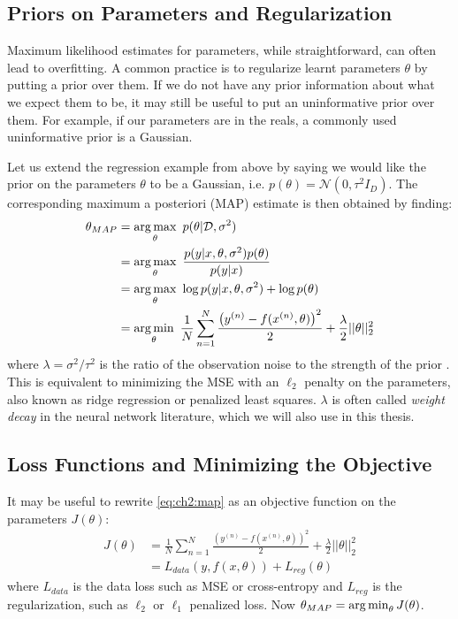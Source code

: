 \subsection{Priors on Parameters and Regularization}
  Maximum likelihood estimates for parameters, while straightforward, can often
  lead to overfitting. A common practice is to regularize learnt parameters
  $\theta$ by putting a prior over them. If we do not have any prior information
  about what we expect them to be, it may still be useful to put an
  uninformative prior over them. For example, if our parameters are in the
  reals, a commonly used uninformative prior is a Gaussian.

  Let us extend the regression example from above by saying we would like the
  prior on the parameters $\theta$ to be a Gaussian, i.e. 
  $p(\theta) = \mathcal{N}(0, \tau^2I_D)$. The corresponding maximum a posteriori
  (MAP) estimate is then obtained by finding:
  \begin{align}\label{eq:ch2:map}
    \theta_{MAP} &= \operatorname*{arg\,max}_\theta\ p(\theta | \mathcal{D}, \sigma^2) \\
                 &= \operatorname*{arg\,max}_\theta\ \frac{p(y| x, \theta, \sigma^2) p(\theta)}{p(y|x)} \\
                 &= \operatorname*{arg\,max}_\theta\ \log p(y|x, \theta, \sigma^2) + \log p(\theta) \\
                 &= \operatorname*{arg\,min}_{\theta}\ \frac{1}{N}\sum_{n=1}^{N} \frac{\left(y^{(n)} - f(x^{(n)}, \theta)\right)^2}{2} + 
      \frac{\lambda}{2} ||\theta||_2^2
  \end{align}
  where $\lambda = \sigma^2/\tau^2$ is the ratio of the observation noise to the
  strength of the prior \cite[Chapter~7]{murphy_machine_2012}. This is
  equivalent to minimizing the MSE with an $\ell_2$ penalty on the parameters,
  also known as ridge regression or penalized least squares.
  $\lambda$ is often called \emph{weight decay} in the neural network
  literature, which we will also use in this thesis.
  
\subsection{Loss Functions and Minimizing the Objective}
  It may be useful to rewrite \eqref{eq:ch2:map} as an objective function on the
  parameters $J(\theta)$:
  \begin{align}
    J(\theta) &=\frac{1}{N}\sum_{n=1}^{N} \frac{\left(y^{(n)} - f(x^{(n)}, \theta)\right)^2}{2} + 
                  \frac{\lambda}{2} ||\theta||_2^2 \label{eq:ch2:regression_ob} \\
              &= L_{data}(y, f(x, \theta)) + L_{reg}(\theta) \label{eq:ch2:objective}
  \end{align}
  where $L_{data}$ is the data loss such as MSE or cross-entropy and
  $L_{reg}$ is the regularization, such as $\ell_2$ or $\ell_1$ penalized loss. 
  Now $\theta_{MAP} = \operatorname*{arg\,min}_\theta J(\theta)$. 

